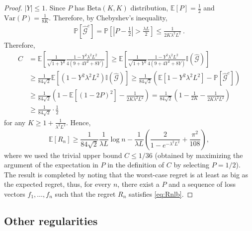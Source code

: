 \documentclass[english]{article}
\newcommand{\cG}{\mathcal{G}}
\newcommand{\E}{\mathbb{E}}
\newcommand{\Exp}[1]{\mathbb{E}\left[ #1 \right]}
\newcommand{\ind}{\mathbb{I}}
\newcommand{\Prob}[1]{\mathbb{P}\left[#1\right]}
\begin{document}
\begin{proof}
	$|Y| \le 1$. Since $P$ has $\mbox{Beta}(K,K)$ distribution, $\Exp{P} = \frac{1}{2}$ and $\mbox{Var}(P) = \frac{1}{8K}$. Therefore, by Chebyshev's inequality,
	\begin{align*}
	\Prob{\widehat{\cG}^c} = \Prob{ \left| P-\frac{1}{2}\right| > \frac{\lambda L}{2} } \le \frac{1}{2 K \lambda^2 L^2}~.
	\end{align*}
Therefore,
	\begin{align*}
	C &= \Exp{\frac{1}{\sqrt{1+Y^2 }}\frac{1-Y^2\lambda^2L^2}{ 4 (9+ 4Y^2 +8 Y )}}
	 \ge \Exp{\frac{1}{\sqrt{1+Y^2 }}\frac{1-Y^2\lambda^2L^2}{ 4 (9+ 4Y^2 +8 Y )} \ind(\widehat{\cG}) } \\
	& \ge \frac{1}{84\sqrt{2}}\Exp{(1-Y^2\lambda^2L^2)\ind(\widehat{\cG})} 
	 \ge \frac{1}{84\sqrt{2}} \left( \Exp{1-Y^2\lambda^2L^2} - \Prob{\widehat{\cG}^c}\right) \\
	& \ge \frac{1}{84\sqrt{2}} \left( 1- \Exp{(1-2P)^2} - \frac{1}{2K\lambda^2L^2}\right)
	= \frac{1}{84\sqrt{2}} \left( 1 - \frac{1}{2K} - \frac{1}{2K\lambda^2L^2} \right) \\
	& \ge \frac{1}{84\sqrt{2}} \cdot \frac{1}{2}
	\end{align*}
	for any $K \ge 1+ \frac{1}{\lambda^2 L^2}$.
	Hence, 
	\[
	\Exp{R_n} \ge \frac{1}{84\sqrt{2}}\frac{1}{\lambda L} \log n  - \frac{1}{\lambda L} \left(\frac{2}{1-e^{-\lambda^2L^2}} + \frac{\pi^2}{108}\right),
	\]
	where we used the trivial upper bound $C \le 1/36$ (obtained by maximizing the argument of the expectation in $P$ in the definition of $C$ by selecting $P=1/2$).
	The result is completed by noting that the worst-case regret is at least as big as the expected regret, thus, for every $n$, there exist a $P$ and a sequence of loss vectors $f_1,\ldots,f_n$ such that the regret $R_n$ satisfies \eqref{eq:Rnlb}. %
\end{proof}


\subsection{Other regularities}
\end{document}
